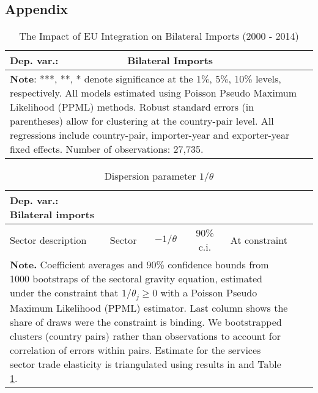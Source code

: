 \documentclass[a4paper,12pt]{article}
\begin{document}
\clearpage
\begin{appendix}
\renewcommand*{\thesection}{\Alph{section}}
\setcounter{table}{0}
\renewcommand{\thetable}{A\arabic{table}}
\setcounter{figure}{0}
\renewcommand{\thefigure}{A\arabic{figure}}

\section{Appendix}\label{apx:info}



\renewcommand{\tabcolsep}{.5cm}

\renewcommand{\arraystretch}{1.1}

\begin{table}[h]
\caption{The Impact of EU Integration on Bilateral Imports (2000 - 2014)}\label{table_basic}
\centering
\scriptsize{
\begin{tabular}{lcccc}
Dep. var.: & \multicolumn{4}{l}{Bilateral Imports}\\
\toprule						

\bottomrule
\multicolumn{5}{l}{\parbox[t]{5.8in}{\scriptsize{\textbf{Note}: ***, **, * denote significance at the 1\%, 5\%, 10\% levels, respectively. All models estimated using Poisson Pseudo Maximum Likelihood (PPML) methods. Robust standard errors (in parentheses) allow for clustering at the country-pair level. All regressions include country-pair, importer-year and exporter-year fixed effects. Number of observations: 27,735.}}}
\end {tabular}}
\end{table} 




\renewcommand{\tabcolsep}{.5cm}

\begin{table}[t]
\caption{Dispersion parameter $1/\theta$}
\label{table_dispersion}
\centering \vspace*{0.6cm}
{\scriptsize
\begin{tabular}{lcccccc}
Dep. var.: Bilateral imports\\
\toprule
Sector description & Sector & $-1/\theta$ & 90\% c.i. & At constraint \\
\midrule

\bottomrule
\multicolumn{5}{l}{\parbox[t]{5.9in}{\textbf{Note.} Coefficient averages and 90\% confidence bounds from 1000 bootstraps of the sectoral gravity equation, estimated under the constraint that $1/\theta_j\geq 0$ with a Poisson Pseudo Maximum Likelihood (PPML) estimator.  Last column shows the share of draws were the constraint is binding. We bootstrapped clusters (country pairs) rather than observations to account for correlation of errors within pairs. Estimate for the services sector trade elasticity is triangulated using results in \cite{egger2012trade} and Table \ref{table_basic}. }}
\end{tabular}}
\end{table}




\end{appendix}
\end{document}

